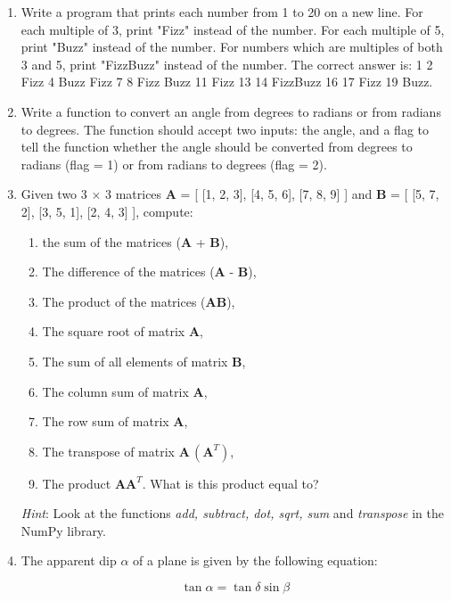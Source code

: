\documentclass[a4paper , 12pt]{book}
\begin{document}
\begin{enumerate}
    \item Write a program that prints each number from 1 to 20 on a new line. For each multiple of 3, print "Fizz" instead of the number. For each multiple of 5, print "Buzz" instead of the number. For numbers which are multiples of both 3 and 5, print "FizzBuzz" instead of the number. The correct answer is: 1 2 Fizz 4 Buzz Fizz 7 8 Fizz Buzz 11 Fizz 13 14 FizzBuzz 16 17 Fizz 19 Buzz.
    
    \item Write a function to convert an angle from degrees to radians or from radians to degrees. The function should accept two inputs: the angle, and a flag to tell the function whether the angle should be converted from degrees to radians (flag = 1) or from radians to degrees (flag = 2).
    
    \item Given two 3 $\times$ 3 matrices \textbf{A} = [ [1, 2, 3], [4, 5, 6], [7, 8, 9] ] and \textbf{B} = [ [5, 7, 2], [3, 5, 1], [2, 4, 3] ], compute: 
    \begin{enumerate}
    \item  the sum of the matrices (\textbf{A} + \textbf{B}), 
    \item  The difference of the matrices (\textbf{A} - \textbf{B}), 
    \item  The product of the matrices (\textbf{AB}), 
    \item  The square root of matrix \textbf{A}, 
    \item  The sum of all elements of matrix \textbf{B}, 
    \item  The column sum of matrix \textbf{A}, 
    \item  The row sum of matrix \textbf{A}, 
    \item  The transpose of matrix $\textbf{A}\, (\textbf{A}^T)$, 
    \item  The product $\textbf{AA}^T$. What is this product equal to?
    \end{enumerate} 
    
    \textit{Hint}: Look at the functions \textit{add, subtract, dot, sqrt, sum} and \textit{transpose} in the NumPy library. 
    
    \item The apparent dip $\alpha$ of a plane is given by the following equation:
    
    \begin{equation}
        \tan\alpha=\tan\delta\sin\beta
    \end{equation}
    

\end{enumerate}
\end{document}
